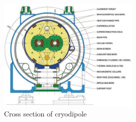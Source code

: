 \begin{figure}[t]
  \centering
	\includegraphics[width=0.6\textwidth]{images/LHCdipolemagnets.jpg}
  	\caption[LHCCell]
   	{Cross section of cryodipole}
	\label{fig:LHCdipolemagnets}
\end{figure}

